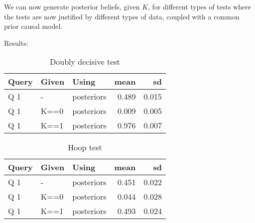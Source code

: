 \documentclass[
  12pt,
]{book}
\newenvironment{Shaded}{\begin{snugshade}}{\end{snugshade}}
\newcommand{\FloatTok}[1]{\textcolor[rgb]{0.00,0.00,0.81}{#1}}
\newcommand{\KeywordTok}[1]{\textcolor[rgb]{0.13,0.29,0.53}{\textbf{#1}}}
\newcommand{\NormalTok}[1]{#1}
\newcommand{\OperatorTok}[1]{\textcolor[rgb]{0.81,0.36,0.00}{\textbf{#1}}}
\newcommand{\StringTok}[1]{\textcolor[rgb]{0.31,0.60,0.02}{#1}}
\begin{document}
We can now generate posterior beliefs, given \(K\), for different types of tests where the tests are now justified by different types of data, coupled with a common prior causal model.

Results:

\begin{Shaded}
\end{Shaded}

\begin{table}

\caption{\label{tab:unnamed-chunk-91}Doubly decisive test}
\centering
\begin{tabular}[t]{l|l|l|r|r}
\hline
Query & Given & Using & mean & sd\\
\hline
Q 1 & - & posteriors & 0.489 & 0.015\\
\hline
Q 1 & K==0 & posteriors & 0.009 & 0.005\\
\hline
Q 1 & K==1 & posteriors & 0.976 & 0.007\\
\hline
\end{tabular}
\end{table}

\begin{table}

\caption{\label{tab:unnamed-chunk-91}Hoop test}
\centering
\begin{tabular}[t]{l|l|l|r|r}
\hline
Query & Given & Using & mean & sd\\
\hline
Q 1 & - & posteriors & 0.451 & 0.022\\
\hline
Q 1 & K==0 & posteriors & 0.044 & 0.028\\
\hline
Q 1 & K==1 & posteriors & 0.493 & 0.024\\
\hline
\end{tabular}
\end{table}
\end{document}
